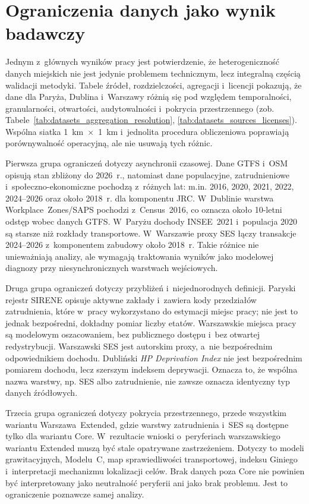 \documentclass{pracamgr}
\begin{document}
\section{Ograniczenia danych jako wynik badawczy}\label{section:ch5_ograniczenia_danych}

Jednym z~głównych wyników pracy jest potwierdzenie, że heterogeniczność danych miejskich nie jest jedynie problemem technicznym, lecz integralną częścią walidacji metodyki. Tabele źródeł, rozdzielczości, agregacji i~licencji pokazują, że dane dla Paryża, Dublina i~Warszawy różnią się pod względem temporalności, granularności, otwartości, audytowalności i~pokrycia przestrzennego (zob. Tabele~\ref{tab:datasets_aggregation_resolution}, \ref{tab:datasets_sources_licenses}). Wspólna siatka 1~km~$\times$~1~km i~jednolita procedura obliczeniowa poprawiają porównywalność operacyjną, ale nie usuwają tych różnic.

Pierwsza grupa ograniczeń dotyczy asynchronii czasowej. Dane \mbox{GTFS} i~\mbox{OSM} opisują stan zbliżony do 2026~r., natomiast dane populacyjne, zatrudnieniowe i~społeczno-ekonomiczne pochodzą z~różnych lat: m.in. 2016, 2020, 2021, 2022, 2024--2026 oraz około 2018~r. dla komponentu \mbox{JRC}. W~Dublinie warstwa \mbox{Workplace~Zones}/\mbox{SAPS} pochodzi z~\mbox{Census~2016}, co oznacza około 10-letni odstęp wobec danych \mbox{GTFS}. W~Paryżu dochody \mbox{INSEE~2021} i~populacja 2020 są starsze niż rozkłady transportowe. W~Warszawie proxy \mbox{SES} łączy transakcje 2024--2026 z~komponentem zabudowy około 2018~r. Takie różnice nie unieważniają analizy, ale wymagają traktowania wyników jako modelowej diagnozy przy niesynchronicznych warstwach wejściowych.

Druga grupa ograniczeń dotyczy przybliżeń i~niejednorodnych definicji. Paryski rejestr \mbox{SIRENE} opisuje aktywne zakłady i~zawiera kody przedziałów zatrudnienia, które w~pracy wykorzystano do estymacji miejsc pracy; nie jest to jednak bezpośredni, dokładny pomiar liczby etatów. Warszawskie miejsca pracy są modelowym oszacowaniem, bez publicznego dostępu i~bez otwartej redystrybucji. Warszawski \mbox{SES} jest autorskim proxy, a~nie bezpośrednim odpowiednikiem dochodu. Dubliński \textit{HP Deprivation Index} nie jest bezpośrednim pomiarem dochodu, lecz szerszym indeksem deprywacji. Oznacza to, że wspólna nazwa warstwy, np. \mbox{SES} albo zatrudnienie, nie zawsze oznacza identyczny typ danych źródłowych.

Trzecia grupa ograniczeń dotyczy pokrycia przestrzennego, przede wszystkim wariantu \mbox{Warszawa~Extended}, gdzie warstwy zatrudnienia i~\mbox{SES} są dostępne tylko dla wariantu \mbox{Core}. W~rezultacie wnioski o~peryferiach warszawskiego wariantu \mbox{Extended} muszą być stale opatrywane zastrzeżeniem. Dotyczy to modeli grawitacyjnych, Modelu~C, map sprawiedliwości transportowej, indeksu Giniego i~interpretacji mechanizmu lokalizacji celów. Brak danych poza \mbox{Core} nie powinien być interpretowany jako neutralność peryferii ani jako brak problemu. Jest to ograniczenie poznawcze samej analizy.
\end{document}
